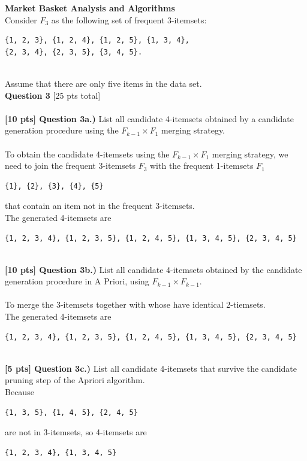 \documentclass[paper=a4, fontsize=11pt]{scrartcl} %
\begin{document}
{\huge \textbf{Market Basket Analysis and Algorithms}} \\

Consider $F_3$ as the following set of frequent 3-itemsets:

\begin{verbatim}
{1, 2, 3}, {1, 2, 4}, {1, 2, 5}, {1, 3, 4}, 
{2, 3, 4}, {2, 3, 5}, {3, 4, 5}.
\end{verbatim} \\

Assume that there are only five items in the data set. \\

{\Large \textbf{Question 3} [25 pts total]} \\
\\
\textbf{[10 pts] Question 3a.)} List all candidate 4-itemsets obtained by a candidate generation procedure using the $F_{k - 1} \times F_1$ merging strategy. \\
\\

To obtain the candidate 4-itemsets using the $F_{k - 1} \times F_1$ merging strategy, we need to join the frequent 3-itemsets $F_3$ with the frequent 1-itemsets $F_1$ 
\begin{verbatim}
{1}, {2}, {3}, {4}, {5}
\end{verbatim}  
that contain an item not in the frequent 3-itemsets. \\

The generated 4-itemsets are
\begin{verbatim}
{1, 2, 3, 4}, {1, 2, 3, 5}, {1, 2, 4, 5}, {1, 3, 4, 5}, {2, 3, 4, 5}
\end{verbatim} \\

\textbf{[10 pts] Question 3b.)} List all candidate 4-itemsets obtained by the candidate generation procedure in A Priori, using $F_{k-1} \times F_{k-1}$. \\
\\

To merge the 3-itemsets together with whose have identical 2-tiemsets. \\
The generated 4-itemsets are 
\begin{verbatim}
{1, 2, 3, 4}, {1, 2, 3, 5}, {1, 2, 4, 5}, {1, 3, 4, 5}, {2, 3, 4, 5}
\end{verbatim} \\

\textbf{[5 pts] Question 3c.)} List all candidate 4-itemsets that survive the candidate pruning step of the Apriori algorithm. \\
Because 
\begin{verbatim}
{1, 3, 5}, {1, 4, 5}, {2, 4, 5}
\end{verbatim} 
are not in 3-itemsets, 
so 4-itemsets are
\begin{verbatim}
{1, 2, 3, 4}, {1, 3, 4, 5}
\end{verbatim} \\
\end{document}
